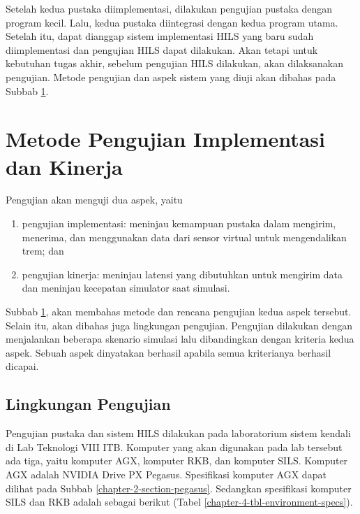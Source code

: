 Setelah kedua pustaka diimplementasi, dilakukan pengujian pustaka dengan program
kecil. Lalu, kedua pustaka diintegrasi dengan kedua program utama. Setelah itu,
dapat dianggap sistem implementasi HILS yang baru sudah diimplementasi dan
pengujian HILS dapat dilakukan. Akan tetapi untuk kebutuhan tugas akhir, sebelum
pengujian HILS dilakukan, akan dilaksanakan pengujian. Metode pengujian dan
aspek sistem yang diuji akan dibahas pada Subbab
\ref{chapter-4-testing-methodology}.

\section{Metode Pengujian Implementasi dan
  Kinerja}\label{chapter-4-testing-methodology}

Pengujian akan menguji dua aspek, yaitu
\begin{enumerate}
	\item pengujian implementasi: meninjau kemampuan pustaka dalam mengirim,
	      menerima, dan menggunakan data dari sensor virtual untuk
	      mengendalikan trem; dan
	\item pengujian kinerja: meninjau latensi yang dibutuhkan untuk mengirim
	      data dan meninjau kecepatan simulator saat simulasi.
\end{enumerate}
Subbab \ref{chapter-4-testing-methodology}, akan membahas metode dan rencana
pengujian kedua aspek tersebut. Selain itu, akan dibahas juga lingkungan
pengujian. Pengujian dilakukan dengan menjalankan beberapa skenario simulasi
lalu dibandingkan dengan kriteria kedua aspek. Sebuah aspek dinyatakan berhasil
apabila semua kriterianya berhasil dicapai.

\subsection{Lingkungan Pengujian}

Pengujian pustaka dan sistem HILS dilakukan pada laboratorium sistem kendali di
Lab Teknologi VIII ITB. Komputer yang akan digunakan pada lab tersebut ada tiga,
yaitu komputer AGX, komputer RKB, dan komputer SILS. Komputer AGX adalah NVIDIA
Drive PX Pegasus. Spesifikasi komputer AGX dapat dilihat pada Subbab
\ref{chapter-2-section-pegasus}. Sedangkan spesifikasi komputer SILS dan RKB
adalah sebagai berikut (Tabel \ref{chapter-4-tbl-environment-specs}).

